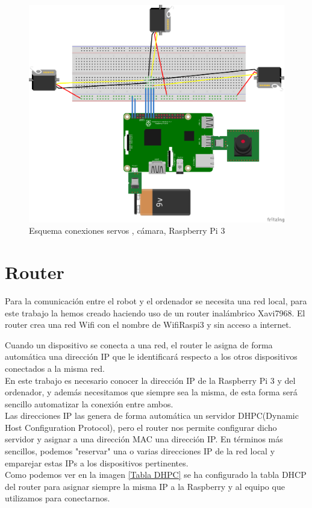 \documentclass[twoside, 11pt]{epstfg}
\begin{document}
\begin{figure}[H]
	\centerline{
		\mbox{\includegraphics[width=.95\textwidth]{images/EsquemaServos.png}}
	}
	\caption{Esquema conexiones servos , cámara, Raspberry Pi 3}
	\label{Figura conexiones robot}
\end{figure}


\section{Router}
Para la comunicación entre el robot y el ordenador se necesita una red local,  para este trabajo la hemos creado haciendo uso de un router inalámbrico Xavi7968.
El router crea una red Wifi con el nombre de WifiRaspi3 y sin acceso a internet.

Cuando un dispositivo se conecta a una red, el router le asigna de forma automática una dirección IP que le identificará respecto a los otros dispositivos conectados a la misma red.\\
En este trabajo es necesario conocer la dirección IP de la Raspberry Pi 3 y del ordenador, y además necesitamos que siempre sea la misma, de esta forma será sencillo automatizar la conexión entre ambos.\\
Las direcciones IP las genera de forma automática un servidor DHPC(Dynamic Host Configuration Protocol), pero el router nos permite configurar dicho servidor y asignar a una dirección MAC una dirección IP. En términos más sencillos, podemos "reservar" una o varias direcciones IP de la red local y emparejar estas IPs a los dispositivos pertinentes.\\
Como podemos ver en la imagen \ref{Tabla DHPC} se ha configurado la tabla DHCP del router para asignar siempre la misma IP a la Raspberry y al equipo que utilizamos para conectarnos.
\end{document}
